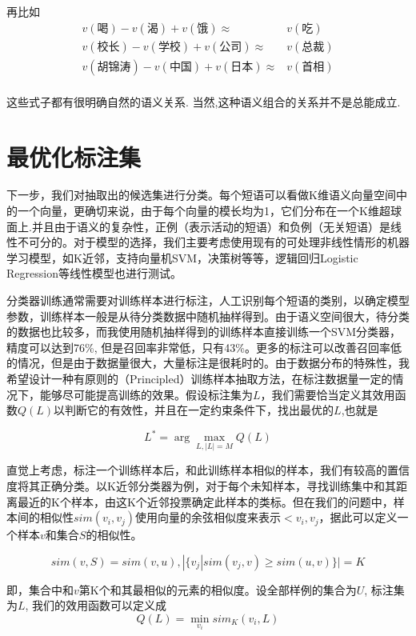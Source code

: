 再比如
\begin{align*}
	v(\text{喝}) - v(\text{渴}) + v(\text{饿}) \approx & v(\text{吃}) \\
	v(\text{校长}) - v(\text{学校}) + v(\text{公司}) \approx & v(\text{总裁}) \\
	v(\text{胡锦涛}) - v(\text{中国}) + v(\text{日本}) \approx & v(\text{首相}) \\
\end{align*}

这些式子都有很明确自然的语义关系.
当然,这种语义组合的关系并不是总能成立.

\section{最优化标注集}

下一步，我们对抽取出的候选集进行分类。每个短语可以看做K维语义向量空间中的一个向量，更确切来说，由于每个向量的模长均为1，它们分布在一个K维超球面上.并且由于语义的复杂性，正例（表示活动的短语）和负例（无关短语）是线性不可分的。对于模型的选择，我们主要考虑使用现有的可处理非线性情形的机器学习模型，如K近邻，支持向量机SVM，决策树等等，逻辑回归Logistic Regression等线性模型也进行测试。

分类器训练通常需要对训练样本进行标注，人工识别每个短语的类别，以确定模型参数，训练样本一般是从待分类数据中随机抽样得到。由于语义空间很大，待分类的数据也比较多，而我使用随机抽样得到的训练样本直接训练一个SVM分类器，精度可以达到76\%, 但是召回率非常低，只有43\%。更多的标注可以改善召回率低的情况，但是由于数据量很大，大量标注是很耗时的。由于数据分布的特殊性，我希望设计一种有原则的（Principled）训练样本抽取方法，在标注数据量一定的情况下，能够尽可能提高训练的效果。假设标注集为$L$，我们需要恰当定义其效用函数$Q(L)$以判断它的有效性，并且在一定约束条件下，找出最优的$L$,也就是

\[
    L^* = \arg\max_{L,|L| = M} Q(L)
\]

直觉上考虑，标注一个训练样本后，和此训练样本相似的样本，我们有较高的置信度将其正确分类。以K近邻分类器为例，对于每个未知样本，寻找训练集中和其距离最近的K个样本，由这K个近邻投票确定此样本的类标。但在我们的问题中，样本间的相似性$sim(v_i, v_j)$使用向量的余弦相似度来表示$<v_i, v_j$，据此可以定义一个样本$v$和集合$S$的相似性。

\begin{definition}
\[
    sim(v, S) = sim(v, u),|\{ {v_j}|sim({v_j},v) \ge sim(u,v)\} | = K
\]
\end{definition}

即，集合中和$v$第K个和其最相似的元素的相似度。设全部样例的集合为$U$, 标注集为$L$, 我们的效用函数可以定义成
\[
    Q(L) = \mathop {\min }\limits_{{v_i}} si{m_K}({v_i},L)
\]

